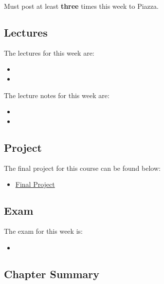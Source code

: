 Must post at least \textbf{three} times this week to Piazza.

\subsection{Lectures}

The lectures for this week are:

\begin{itemize}
    \item {}
    \item {}
\end{itemize}

\noindent The lecture notes for this week are:

\begin{itemize}
    \item {}
    \item {}
\end{itemize}

\subsection{Project}

The final project for this course can be found below:

\begin{itemize}
    \item \href{https://applied.cs.colorado.edu/mod/workshop/view.php?id=60066}{Final Project}
\end{itemize}

\subsection{Exam}

The exam for this week is:

\begin{itemize}
    \item {}
\end{itemize}

\subsection{Chapter Summary}


